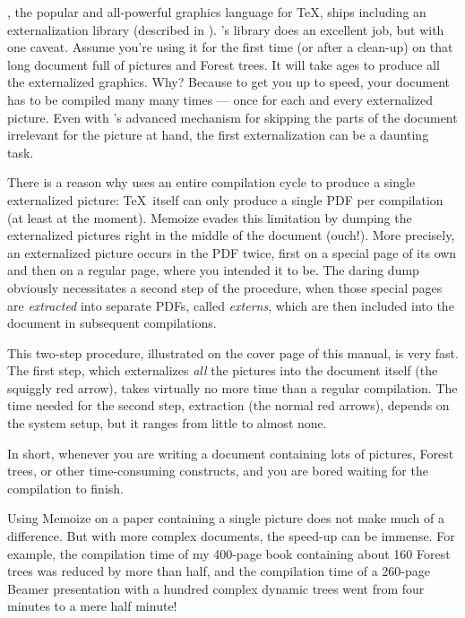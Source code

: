 \documentclass[a4paper,11pt]{article}
\begin{document}
\begin{tcolorbox}[
    title={\introboxtitle{Why} yet another externalization package?},
  ]
  \TikZ, the popular and all-powerful graphics language for \TeX, ships
  including an externalization library (described in ).  \TikZ's
  library does an excellent job, but with one caveat.  Assume you're using it
  for the first time (or after a clean-up) on that long document full of \TikZ
  pictures and Forest trees.  It will take ages to produce all the externalized
  graphics.  Why?  Because to get you up to speed, your document has to be
  compiled many many times --- once for each and every externalized picture.
  Even with \TikZ's advanced mechanism for skipping the parts of the document
  irrelevant for the picture at hand, the first externalization can be a
  daunting task.
\end{tcolorbox}

\begin{tcolorbox}[
    title={\introboxtitle[How]{How} does Memoize save your time?},
  ]
  There is a reason why \TikZ uses an entire compilation cycle to produce a
  single externalized picture: \TeX\ itself can only produce a single PDF per
  compilation (at least at the moment).  Memoize evades this limitation by
  dumping the externalized pictures right in the middle of the document
  (ouch!).  More precisely, an externalized picture occurs in the PDF twice,
  first on a special page of its own and then on a regular page, where you
  intended it to be.  The daring dump obviously necessitates a second step of
  the procedure, when those special pages are \emph{extracted} into separate
  PDFs, called \emph{externs}, which are then included into the document in
  subsequent compilations.

  This two-step procedure, illustrated on the cover page of this manual, is
  very fast.  The first step, which externalizes \emph{all} the pictures into
  the document itself (the squiggly red arrow), takes virtually no more time
  than a regular compilation.  The time needed for the second step, extraction
  (the normal red arrows), depends on the system setup, but it ranges from
  little to almost none.
\end{tcolorbox}

\begin{tcolorbox}[
    title={\introboxtitle{When} should I use Memoize?},
  ]
  In short, whenever you are writing a document containing lots of \TikZ
  pictures, Forest trees, or other time-consuming constructs, and you are bored
  waiting for the compilation to finish.

  Using Memoize on a paper containing a single picture does not make much of a
  difference.  But with more complex documents, the speed-up can be immense.
  For example, the compilation time of my 400-page book containing about 160
  Forest trees was reduced by more than half, and the compilation time of a
  260-page Beamer presentation with a hundred complex dynamic trees went from
  four minutes to a mere half minute!
\end{tcolorbox}
\end{document}
